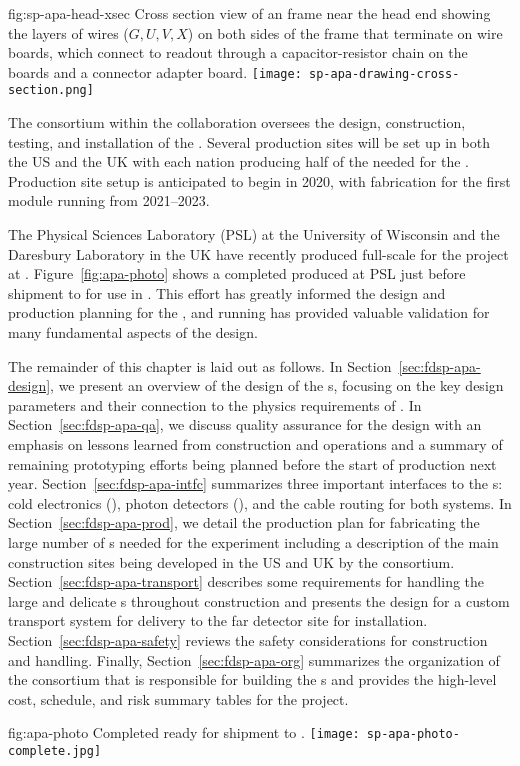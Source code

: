 \begin{dunefigure}{fig:sp-apa-head-xsec}
{Cross section view of an  frame near the head end showing the layers of wires ($G,U,V,X$) on both sides of the frame that terminate on wire boards, which connect to  readout  through a capacitor-resistor chain on the  boards and a connector adapter board.} 
\texttt{[image: sp-apa-drawing-cross-section.png]} 
\end{dunefigure} 


The  consortium within the  collaboration oversees the design, construction, testing, and installation of the . Several  production sites will be set up in both the US and the UK with each nation producing  half of the  needed for the %
.  Production site setup is anticipated to begin in 2020, with  fabrication for the first \nominalmodsize {} module running from 2021--2023.  

The Physical Sciences Laboratory (PSL) at the University of Wisconsin and the Daresbury Laboratory in the UK have recently produced full-scale  for the  project at . Figure~\ref{fig:apa-photo} shows a completed  produced at PSL just before shipment to  for use in . This effort has greatly informed the design and production planning for the  , and  running has provided valuable validation for many fundamental aspects of the   design. 


The remainder of this chapter is laid out as follows.  In Section~\ref{sec:fdsp-apa-design}, we present an overview of the design of the s, focusing on the key design parameters and their connection to the physics requirements of .  In Section~\ref{sec:fdsp-apa-qa}, we discuss quality assurance for the design with an emphasis on lessons learned from  construction and operations and a summary of remaining prototyping efforts being planned before the start of production next year. Section~\ref{sec:fdsp-apa-intfc} summarizes three important interfaces to the s:  cold electronics (), photon detectors (), and the cable routing for both systems.  In Section~\ref{sec:fdsp-apa-prod}, we detail the production plan for fabricating the large number of s needed for the experiment including a description of the main construction sites being developed in the US and UK by the  consortium.  Section~\ref{sec:fdsp-apa-transport} describes some requirements for handling the large and delicate s throughout construction and presents the design for a custom transport system for delivery to the far detector site for installation. Section~\ref{sec:fdsp-apa-safety} reviews the safety considerations for  construction and handling. Finally,  Section~\ref{sec:fdsp-apa-org} summarizes the organization of the  consortium that is responsible for building the s and provides the high-level cost, schedule, and risk summary tables for the project. 

\begin{dunefigure}{fig:apa-photo}
{Completed   ready for shipment to .}
\texttt{[image: sp-apa-photo-complete.jpg]}
\end{dunefigure}
